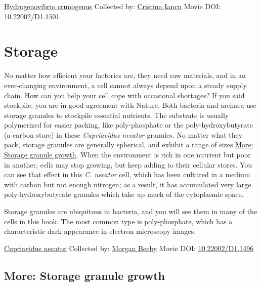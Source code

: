 \documentclass[]{tufte-book}
\begin{document}
\hypertarget{htmlwidget-4675488b7072d479a7bf}{}

\label{fig:4-7b}\protect\hyperlink{tree}{Hydrogenovibrio crunogenus} Collected by: \protect\hyperlink{cristina_iancu}{Cristina Iancu} Movie DOI: \href{https://doi.org/10.22002/D1.1501}{10.22002/D1.1501}

\hypertarget{storage}{%
\section{Storage}\label{storage}}

No matter how efficient your factories are, they need raw materials, and in an ever-changing environment, a cell cannot always depend upon a steady supply chain. How can you help your cell cope with occasional shortages? If you said stockpile, you are in good agreement with Nature. Both bacteria and archaea use storage granules to stockpile essential nutrients. The substrate is usually polymerized for easier packing, like poly-phosphate or the poly-hydroxybutyrate (a carbon store) in these \emph{Cupriavidus necator} granules. No matter what they pack, storage granules are generally spherical, and exhibit a range of sizes \protect\hyperlink{Storage_granule_growth}{More: Storage granule growth}. When the environment is rich in one nutrient but poor in another, cells may stop growing, but keep adding to their cellular stores. You can see that effect in this \emph{C. necator} cell, which has been cultured in a medium with carbon but not enough nitrogen; as a result, it has accumulated very large poly-hydroxybutyrate granules which take up much of the cytoplasmic space.

Storage granules are ubiquitous in bacteria, and you will see them in many of the cells in this book. The most common type is poly-phosphate, which has a characteristic dark appearance in electron microscopy images.



\hypertarget{htmlwidget-974085284af9ba0215a4}{}

\label{fig:4-8}\protect\hyperlink{tree}{Cupriavidus necator} Collected by: \protect\hyperlink{morgan_beeby}{Morgan Beeby} Movie DOI: \href{https://doi.org/10.22002/D1.1496}{10.22002/D1.1496}

\hypertarget{Storage_granule_growth}{%
\subsection*{More: Storage granule growth}\label{Storage_granule_growth}}
\end{document}
